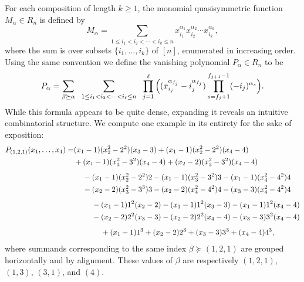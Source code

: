 \documentclass[submission]{FPSAC2024}
\newtheorem{prop}[equation]{Proposition}
\theoremstyle{definition}
\theoremstyle{remark}
\numberwithin{equation}{section}
\begin{document}
For each composition of length $k \ge 1$, the monomial quasisymmetric function $M_{\alpha} \in R_{n}$ is defined by
\[
M_{\alpha} = \sum_{1\le i_1<i_2<\cdots<i_k\le n} x_{i_1}^{\alpha_1} x_{i_2}^{\alpha_2}\cdots  x_{i_k}^{\alpha_k},
\]
where the sum is over subsets $\{i_{1}, \ldots, i_{k}\}$ of $[n]$, enumerated in increasing order.  Using the same convention we define the vanishing polynomial $P_{\alpha} \in R_{n}$ to be
\[
P_{\alpha} =  
\sum_{\beta \succeq \alpha}
\hspace{0.6em}
\sum_{1\le i_{1} < i_{2} < \cdots < i_{\ell} \le n} 
\hspace{0.6em}
\prod_{j = 1}^{\ell}
\Big(
(x_{i_{j}}^{\alpha_{f_{j}}} - i_{j}^{\alpha_{f_{j}}}) 
\prod_{s = f_{j} + 1}^{f_{j+1} - 1} (- i_{j})^{\alpha_{s}}
\Big).
\]
While this formula appears to be quite dense, expanding it reveals an intuitive combinatorial structure.  We compute one example in its entirety for the sake of exposition: 
\begin{align*}
P_{(1, 2, 1)}(x_{1}, \ldots, x_{4}) =& (x_{1} - 1)(x_{2}^{2} - 2^{2})(x_{3} - 3) + (x_{1} - 1)(x_{2}^{2} - 2^{2})(x_{4} - 4) \\
&+ (x_{1} - 1)(x_{3}^{2} - 3^{2})(x_{4} - 4) + (x_{2} - 2)(x_{3}^{2} - 3^{2})(x_{4} - 4) \\[1ex]
&\hspace{1.2em} -  (x_{1} - 1)(x_{2}^{2} - 2^{2})2 -  (x_{1} - 1)(x_{3}^{2} - 3^{2})3 -  (x_{1} - 1)(x_{4}^{2} - 4^{2})4  \\
&\hspace{1.2em} -  (x_{2} - 2)(x_{3}^{2} - 3^{3})3 -  (x_{2} - 2)(x_{4}^{2} - 4^{2})4 -  (x_{3} - 3)(x_{4}^{2} - 4^{2})4 \\[1ex]
&\hspace{2.4em} -  (x_{1} - 1)1^{2}(x_{2} - 2) -  (x_{1} - 1)1^{2}(x_{3} - 3) -  (x_{1} - 1)1^{2}(x_{4} - 4) \\
&\hspace{2.4em} -  (x_{2} - 2)2^{2}(x_{3} - 3) -  (x_{2} - 2)2^{2}(x_{4} - 4) -  (x_{3} - 3)3^{2}(x_{4} - 4) \\[1ex]
&\hspace{3.6em} + (x_{1} - 1) 1^{3} + (x_{2} - 2) 2^{3} + (x_{3} - 3) 3^{3} + (x_{4} - 4) 4^{3},
\end{align*}
where summands corresponding to the same index $\beta \succeq (1, 2, 1)$ are grouped horizontally and by alignment.  These values of $\beta$ are respectively $(1, 2, 1)$, $(1, 3)$, $(3, 1)$, and $(4)$.

\end{document}
